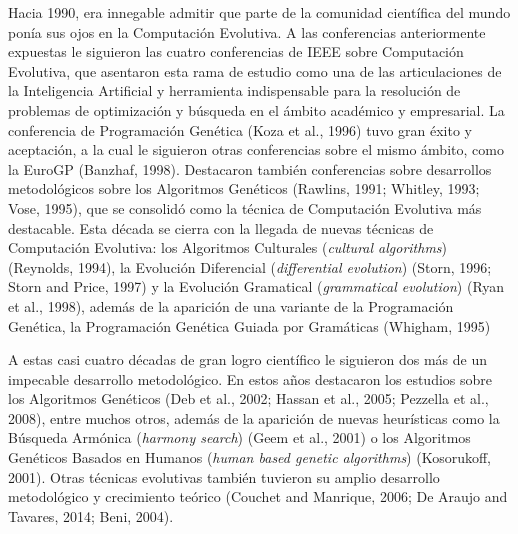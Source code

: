 \documentclass[spanish,a4paper,12pt,twoside]{report}
\begin{document}
  Hacia 1990, era innegable admitir que parte de la comunidad científica del mundo ponía sus ojos en la Computación Evolutiva. A las conferencias anteriormente expuestas le siguieron las cuatro conferencias de IEEE sobre Computación Evolutiva, que asentaron esta rama de estudio como una de las articulaciones de la Inteligencia Artificial y herramienta indispensable para la resolución de problemas de optimización y búsqueda en el ámbito académico y empresarial. La conferencia de Programación Genética (Koza et al., 1996) tuvo gran éxito y aceptación, a la cual le siguieron otras conferencias sobre el mismo ámbito, como la EuroGP (Banzhaf, 1998). Destacaron también conferencias sobre desarrollos metodológicos sobre los Algoritmos Genéticos (Rawlins, 1991; Whitley, 1993; Vose, 1995), que se consolidó como la técnica de Computación Evolutiva más destacable. Esta década se cierra con la llegada de nuevas técnicas de Computación Evolutiva: los Algoritmos Culturales (\emph{cultural algorithms}) (Reynolds, 1994), la Evolución Diferencial (\emph{differential evolution}) (Storn, 1996; Storn and Price, 1997) y la Evolución Gramatical (\emph{grammatical evolution}) (Ryan et al., 1998), además de la aparición de una variante de la Programación Genética, la Programación Genética Guiada por Gramáticas (Whigham, 1995) \par
  A estas casi cuatro décadas de gran logro científico le siguieron dos más de un impecable desarrollo metodológico. En estos años destacaron los estudios sobre los Algoritmos Genéticos (Deb et al., 2002; Hassan et al., 2005; Pezzella et al., 2008), entre muchos otros, además de la aparición de nuevas heurísticas como la Búsqueda Armónica (\emph{harmony search}) (Geem et al., 2001) o los Algoritmos Genéticos Basados en Humanos (\emph{human based genetic algorithms}) (Kosorukoff, 2001). Otras técnicas evolutivas también tuvieron su amplio desarrollo metodológico y crecimiento teórico (Couchet and Manrique, 2006; De Araujo and Tavares, 2014; Beni, 2004).
\end{document}
